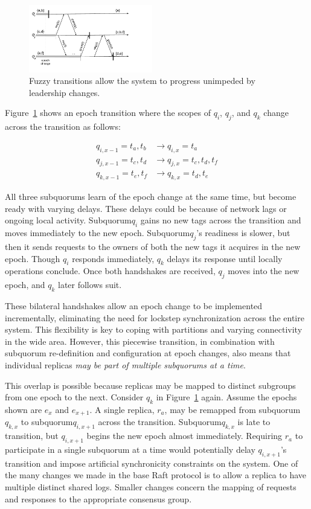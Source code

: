 \documentclass[10pt,conference]{IEEEtran}
\newcommand{\sub}{subquorum\xspace}
\newcommand{\Sub}{Subquorum\xspace}
\newcommand{\subs}{subquorums\xspace}
\begin{document}
\begin{figure}[t]
    \centering
    \includegraphics[width=0.48\textwidth]{figures/namespaceHandoff}
    \caption{Fuzzy transitions allow the system to progress unimpeded by
    leadership changes.}
    \label{fig:handoff}
\end{figure}

Figure~\ref{fig:handoff} shows an epoch transition where the scopes of
$q_i$, $q_j$, and $q_k$ change across the transition as follows:

\begin{align*}
  \label{eq:3}
  q_{i,x-1} = t_a, t_b  &\longrightarrow q_{i,x} = t_a\\
  q_{j,x-1} = t_c, t_d  &\longrightarrow q_{j,x} = t_c,t_d,t_f\\
  q_{k,x-1} = t_e, t_f  &\longrightarrow q_{k,x} = t_d,t_e
\end{align*}

All three \subs learn of the epoch change at the same time, but become ready
with varying delays.
These delays could be because of network lags or ongoing local activity.
\Sub $q_i$ gains no new tags across the transition and moves immediately to the new epoch.
\Sub $q_j$'s readiness is slower, but then it sends requests to the
owners of both the new tags it acquires in the new epoch.
Though $q_i$ responds immediately, $q_k$ delays its response until locally
operations conclude.
Once both handshakes are received, $q_j$ moves into the new epoch, and $q_k$
later follows suit.

These bilateral handshakes allow an epoch change to be implemented
incrementally, eliminating the need for lockstep synchronization across the entire
system.
This flexibility is key to coping with partitions and varying connectivity in
the wide area.
However, this piecewise transition, in combination with \sub re-definition and
configuration at epoch changes, also means that individual replicas \emph{may
be part of multiple \subs at a time}.

This overlap is possible because replicas may be mapped to distinct subgroups
from one epoch to the next.
Consider $q_k$ in Figure~\ref{fig:handoff} again.
Assume the epochs shown are $e_x$ and $e_{x+1}$.
A single replica, $r_a$, may be remapped from \sub $q_{k,x}$ to \sub $q_{i,x+1}$ across the
transition.
\Sub $q_{k,x}$ is late to transition, but $q_{i,x+1}$ begins the new epoch
almost immediately.
Requiring $r_a$ to participate in a single \sub at a time would potentially delay
$q_{i,x+1}$'s transition and impose artificial synchronicity constraints on the
system.
One of the many changes we made in the base Raft protocol is to
allow a replica to have multiple distinct shared
logs.
Smaller changes concern the mapping of requests and responses to the appropriate
consensus group.
\end{document}
